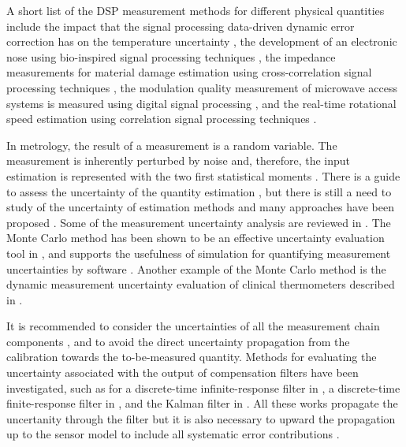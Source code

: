 A short list of the DSP measurement methods for different physical quantities include 
the impact that the signal processing data-driven dynamic error correction has on the temperature uncertainty \cite{Saggin01},
the development of an electronic nose using bio-inspired signal processing techniques \cite{Jing16},
the impedance measurements for material damage estimation using cross-correlation signal processing techniques \cite{deCastro19},
the modulation quality measurement of microwave access systems is measured using digital signal processing \cite{Angrisani10}, and
the real-time rotational speed estimation using correlation signal processing techniques \cite{Wang14}.

In metrology, the result of a measurement is a random variable.
The measurement is inherently perturbed by noise and, therefore, the input estimation is represented with the two first statistical moments \cite{Ferrero06}.
There is a guide to assess the uncertainty of the quantity estimation \cite{GUM08}, but there is still a need to study of the uncertainty of estimation methods and many approaches have been proposed \cite{Esward09, Hessling10}.
Some of the measurement uncertainty analysis are reviewed in \cite{daSilva12}.
The Monte Carlo method has been shown to be an effective uncertainty evaluation tool in \cite{Cox06},
and supports the usefulness of simulation for quantifying measurement uncertainties by software \cite{Esward16}.
Another example of the Monte Carlo method is the dynamic measurement uncertainty evaluation of clinical thermometers described in \cite{Ogorevc16}.

% 
It is recommended to consider the uncertainties of all the measurement chain components \cite{Diniz17}, and to avoid the direct uncertainty propagation from the calibration towards the to-be-measured quantity.  
Methods for evaluating the uncertainty associated with the output of compensation filters have been investigated, such as for
a discrete-time infinite-response filter in \cite{Link09},
a discrete-time finite-response filter in \cite{Elster07, Elster08}, and
the Kalman filter in \cite{Eichstadt16b}.
All these works propagate the uncertanity through the filter but it is also necessary to upward the propagation up to the sensor model to include all systematic error contributions \cite{Hessling11}.

